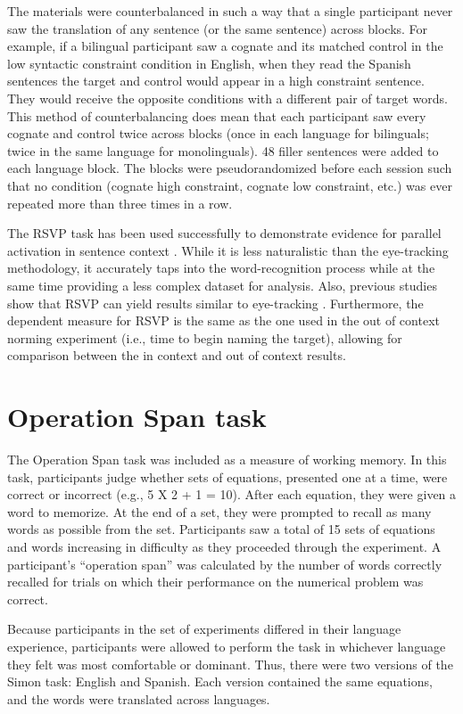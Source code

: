 The materials were counterbalanced in such a way that a single participant never saw the translation of any sentence (or the same sentence) across blocks. For example, if a bilingual participant saw a cognate and its matched control in the low syntactic constraint condition in English, when they read the Spanish sentences the target and control would appear in a high constraint sentence. They would receive the opposite conditions with a different pair of target words. This method of counterbalancing does mean that  each participant saw every cognate and control twice across blocks (once in each language for bilinguals; twice in the same language for monolinguals). 48 filler sentences were added to each language block. The blocks were pseudorandomized before each session such that no condition (cognate high constraint, cognate low constraint, etc.) was ever repeated more than three times in a row.   

The RSVP task has been used successfully to demonstrate evidence for parallel activation in sentence context  \parencite[e.g.,][]{Schwartz2006}. While it is less naturalistic than the eye-tracking methodology, it accurately taps into the word-recognition process while at the same time providing a less complex dataset for analysis. Also, previous studies show that RSVP can yield  results similar to eye-tracking \parencite[][]{Altarriba1996}. Furthermore, the dependent  measure for RSVP is the same as the one used in the out of context norming experiment (i.e., time to begin naming the target), allowing for comparison between the in context and out of context results.

\section{Operation Span task}
The Operation Span task \parencite[][]{Turner1989} was included as a measure of working memory. In this task, participants judge whether sets of equations, presented one at a time, were correct or incorrect (e.g., 5 X 2 + 1 = 10). After each equation, they were given a word to memorize. At the end of a set, they were prompted to recall as many words as possible from the set. Participants saw a total of 15 sets of equations and words increasing in difficulty as they proceeded through the experiment. A participant’s “operation span” was calculated by the number of words correctly recalled for trials on which their performance on the numerical problem was correct. 

Because participants in the set of experiments differed in their language experience, participants were allowed to perform the task in whichever language they felt was most comfortable or dominant. Thus, there were two versions of the Simon task: English and Spanish. Each version contained the same equations, and the words were translated across languages. 


